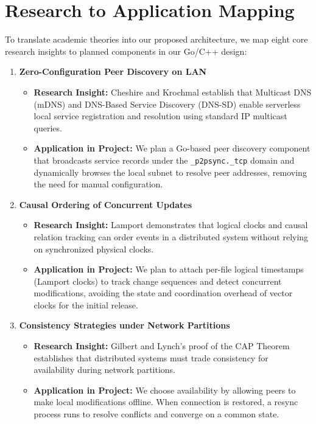 \section{Research to Application Mapping}

To translate academic theories into our proposed architecture, we map eight core research insights to planned components in our Go/C++ design:

\begin{enumerate}
    \item \textbf{Zero-Configuration Peer Discovery on LAN}
    \begin{itemize}
        \item \textbf{Research Insight:} Cheshire and Krochmal \cite{rfc6762, rfc6763} establish that Multicast DNS (mDNS) and DNS-Based Service Discovery (DNS-SD) enable serverless local service registration and resolution using standard IP multicast queries.
        \item \textbf{Application in Project:} We plan a Go-based peer discovery component that broadcasts service records under the \texttt{\_p2psync.\_tcp} domain and dynamically browses the local subnet to resolve peer addresses, removing the need for manual configuration.
    \end{itemize}

    \item \textbf{Causal Ordering of Concurrent Updates}
    \begin{itemize}
        \item \textbf{Research Insight:} Lamport \cite{lamport1978} demonstrates that logical clocks and causal relation tracking can order events in a distributed system without relying on synchronized physical clocks.
        \item \textbf{Application in Project:} We plan to attach per-file logical timestamps (Lamport clocks) to track change sequences and detect concurrent modifications, avoiding the state and coordination overhead of vector clocks for the initial release.
    \end{itemize}

    \item \textbf{Consistency Strategies under Network Partitions}
    \begin{itemize}
        \item \textbf{Research Insight:} Gilbert and Lynch's proof of the CAP Theorem \cite{brewer2002} establishes that distributed systems must trade consistency for availability during network partitions.
        \item \textbf{Application in Project:} We choose availability by allowing peers to make local modifications offline. When connection is restored, a resync process runs to resolve conflicts and converge on a common state.
    \end{itemize}


\end{enumerate}

